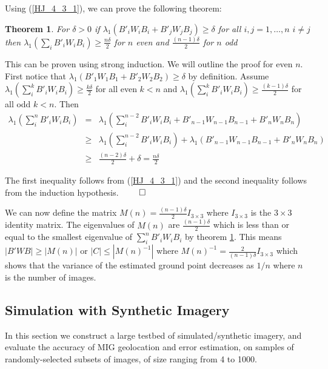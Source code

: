 \documentclass[10pt]{amsart}
\newtheorem{theorem}{Theorem}
\begin{document}
Using (\ref{HJ_4_3_1}), we can prove the following theorem:

\begin{theorem} \label{theorem_2}
	 For $\delta > 0$ if $\lambda_1(B'_iW_iB_i + B'_jW_jB_j) \geq \delta$
         for all $i, j = 1, \dots, n$ $i \ne j$ then $\lambda_1(\sum_i
         B'_iW_iB_i) \geq \frac{n\delta}{2}$ for $n$ even and
         $\frac{(n-1)\delta}{2}$ for $n$ odd
\end{theorem}

This can be proven using strong induction.  We will outline the proof for even
$n$.  First notice that $\lambda_1(B'_1W_1B_1 + B'_2W_2B_2) \geq \delta$ by
definition.  Assume $\lambda_1(\sum^k_i B'_iW_iB_i) \geq \frac{k\delta}{2}$ for
all even $k < n$ and $\lambda_1(\sum^k_i B'_iW_iB_i) \geq
\frac{(k-1)\delta}{2}$ for all odd $k < n$.  Then
\begin{eqnarray*}
\lambda_1(\sum^n_iB'_iW_iB_i) &=&\lambda_1(\sum^{n-2}_i B'_iW_iB_i + B'_{n-1}W_{n-1}B_{n-1} +  B'_{n}W_{n}B_{n})\\
&\geq&\lambda_1(\sum^{n-2}_i B'_iW_iB_i) +  \lambda_1(B'_{n-1}W_{n-1}B_{n-1} + B'_{n}W_{n}B_{n})\\
&\geq&\frac{(n-2)\delta}{2} + \delta = \frac{n\delta}{2}
\end{eqnarray*}

The first inequality follows from (\ref{HJ_4_3_1}) and the second
inequality follows from the induction hypothesis. $\qed$

We can now define the matrix $M(n) = \frac{(n-1)\delta}{2}I_{3 \times 3}$ where
$I_{3\times 3}$ is the $3 \times 3$ identity matrix.  The eigenvalues of $M(n)$
are $\frac{(n-1)\delta}{2}$ which is less than or equal to the smallest
eigenvalue of $\sum^n_i B'_iW_iB_i$ by theorem \ref{theorem_2}.  This means
$|B'WB| \geq |M(n)|$ or $|C| \leq |M(n)^{-1}|$ where $M(n)^{-1} =
\frac{2}{(n-1)\delta}I_{3\times 3}$ which shows that the variance of the
estimated ground point decreases as $1/n$ where $n$ is the number of images.

\subsection{\label{simulation}Simulation with Synthetic Imagery}
In this section we construct a large testbed of simulated/\-syn\-the\-tic imagery, and
evaluate the accuracy of MIG geolocation and error estimation, on samples of
randomly-selected subsets of images, of size ranging from 4 to 1000.
\end{document}
